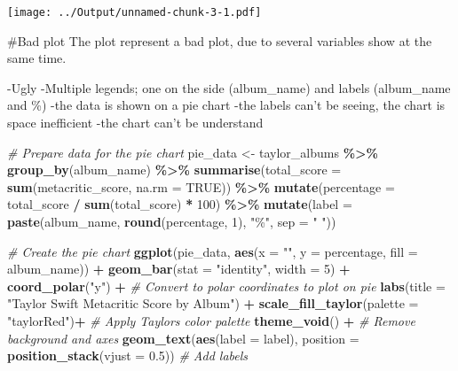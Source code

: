\documentclass[
]{article}
\newenvironment{Shaded}{\begin{snugshade}}{\end{snugshade}}
\newcommand{\AttributeTok}[1]{\textcolor[rgb]{0.13,0.29,0.53}{#1}}
\newcommand{\CommentTok}[1]{\textcolor[rgb]{0.56,0.35,0.01}{\textit{#1}}}
\newcommand{\ConstantTok}[1]{\textcolor[rgb]{0.56,0.35,0.01}{#1}}
\newcommand{\DecValTok}[1]{\textcolor[rgb]{0.00,0.00,0.81}{#1}}
\newcommand{\FloatTok}[1]{\textcolor[rgb]{0.00,0.00,0.81}{#1}}
\newcommand{\FunctionTok}[1]{\textcolor[rgb]{0.13,0.29,0.53}{\textbf{#1}}}
\newcommand{\NormalTok}[1]{#1}
\newcommand{\OtherTok}[1]{\textcolor[rgb]{0.56,0.35,0.01}{#1}}
\newcommand{\SpecialCharTok}[1]{\textcolor[rgb]{0.81,0.36,0.00}{\textbf{#1}}}
\newcommand{\StringTok}[1]{\textcolor[rgb]{0.31,0.60,0.02}{#1}}
\begin{document}
\texttt{[image: ../Output/unnamed-chunk-3-1.pdf]}

\#Bad plot The plot represent a bad plot, due to several variables show
at the same time.

-Ugly -Multiple legends; one on the side (album\_name) and labels
(album\_name and \%) -the data is shown on a pie chart -the labels can't
be seeing, the chart is space inefficient -the chart can't be understand

\begin{Shaded}
\begin{Highlighting}[]
\CommentTok{\# Prepare data for the pie chart}
\NormalTok{pie\_data }\OtherTok{\textless{}{-}}\NormalTok{ taylor\_albums }\SpecialCharTok{\%\textgreater{}\%}
  \FunctionTok{group\_by}\NormalTok{(album\_name) }\SpecialCharTok{\%\textgreater{}\%}
  \FunctionTok{summarise}\NormalTok{(}\AttributeTok{total\_score =} \FunctionTok{sum}\NormalTok{(metacritic\_score, }\AttributeTok{na.rm =} \ConstantTok{TRUE}\NormalTok{)) }\SpecialCharTok{\%\textgreater{}\%}
  \FunctionTok{mutate}\NormalTok{(}\AttributeTok{percentage =}\NormalTok{ total\_score }\SpecialCharTok{/} \FunctionTok{sum}\NormalTok{(total\_score) }\SpecialCharTok{*} \DecValTok{100}\NormalTok{) }\SpecialCharTok{\%\textgreater{}\%}
  \FunctionTok{mutate}\NormalTok{(}\AttributeTok{label =} \FunctionTok{paste}\NormalTok{(album\_name, }\FunctionTok{round}\NormalTok{(percentage, }\DecValTok{1}\NormalTok{), }\StringTok{"\%"}\NormalTok{, }\AttributeTok{sep =} \StringTok{" "}\NormalTok{))}

\CommentTok{\# Create the pie chart}
\FunctionTok{ggplot}\NormalTok{(pie\_data, }\FunctionTok{aes}\NormalTok{(}\AttributeTok{x =} \StringTok{""}\NormalTok{, }
                     \AttributeTok{y =}\NormalTok{ percentage, }
                     \AttributeTok{fill =}\NormalTok{ album\_name)) }\SpecialCharTok{+}
  \FunctionTok{geom\_bar}\NormalTok{(}\AttributeTok{stat =} \StringTok{"identity"}\NormalTok{, }\AttributeTok{width =} \DecValTok{5}\NormalTok{) }\SpecialCharTok{+}
  \FunctionTok{coord\_polar}\NormalTok{(}\StringTok{"y"}\NormalTok{) }\SpecialCharTok{+}  \CommentTok{\# Convert to polar coordinates to plot on pie}
  \FunctionTok{labs}\NormalTok{(}\AttributeTok{title =} \StringTok{"Taylor Swift Metacritic Score by Album"}\NormalTok{) }\SpecialCharTok{+}
                \FunctionTok{scale\_fill\_taylor}\NormalTok{(}\AttributeTok{palette =} \StringTok{"taylorRed"}\NormalTok{)}\SpecialCharTok{+} \CommentTok{\# Apply Taylor\textquotesingle{}s color palette}
  \FunctionTok{theme\_void}\NormalTok{() }\SpecialCharTok{+}  \CommentTok{\# Remove background and axes}
  \FunctionTok{geom\_text}\NormalTok{(}\FunctionTok{aes}\NormalTok{(}\AttributeTok{label =}\NormalTok{ label), }\AttributeTok{position =} \FunctionTok{position\_stack}\NormalTok{(}\AttributeTok{vjust =} \FloatTok{0.5}\NormalTok{))  }\CommentTok{\# Add labels}
\end{Highlighting}
\end{Shaded}
\end{document}
